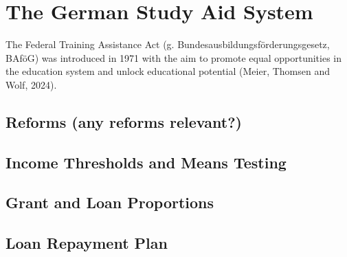\section{The German Study Aid System} \label{section:the-german-study-aid-system}

The Federal Training Assistance Act (g. Bundesausbildungsförderungsgesetz, BAföG) was introduced in 1971 with the aim to promote equal opportunities in the education system and unlock educational potential (Meier, Thomsen and Wolf, 2024).

\subsection{Reforms (any reforms relevant?)} \label{subsection:reforms}

\subsection{Income Thresholds and Means Testing} \label{subsection:thresholds}
\subsection{Grant and Loan Proportions} \label{subsection:grant-to-loan-proportion}
\subsection{Loan Repayment Plan} \label{subsection:grant-to-loan-proportion}
